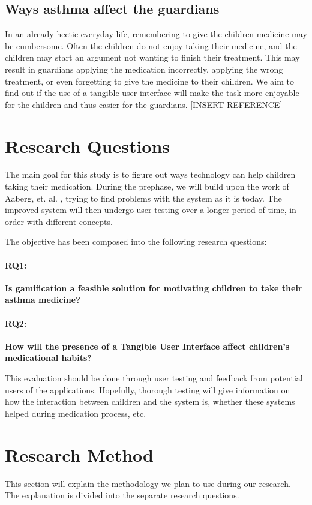 \subsection{Ways asthma affect the guardians}
In an already hectic everyday life, remembering to give the children medicine may be cumbersome. Often the children do not enjoy taking their medicine, and the children may start an argument not wanting to finish their treatment. This may result in guardians applying the medication incorrectly, applying the wrong treatment, or even forgetting to give the medicine to their children. We aim to find out if the use of a tangible user interface will make the task more enjoyable for the children and thus easier for the guardians. [INSERT REFERENCE]


\section{Research Questions}
\label{sec:researchquestions}
The main goal for this study is to figure out ways technology can help children taking their medication. During the prephase, we will build upon the work of Aaberg, et. al.  \cite{CustomerDriven}, trying to find problems with the system as it is today. The improved system will then undergo user testing over a longer period of time, in order with different concepts.


The objective has been composed into the following research questions: 

\paragraph{RQ1:}
\textbf{Is gamification a feasible solution for motivating children to take their asthma medicine?}


\paragraph{RQ2:}
\textbf{How will the presence of a Tangible User Interface affect children's medicational habits?}


This evaluation should be done through user testing and feedback from potential users of the applications. Hopefully, thorough testing will give information on how the interaction between children and the system is, whether these systems helped during medication process, etc. 

\section{Research Method}
\label{sec:researchmethod}
This section will explain the methodology we plan to use during our research. The explanation is divided into the separate research questions.  

